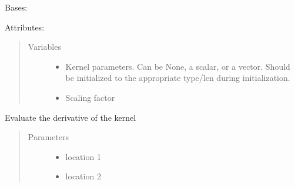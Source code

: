 \documentclass[letterpaper,12pt,english]{sphinxmanual}
\begin{document}
\begin{fulllineitems}
\label{\detokenize{PARyOpt.kernel:PARyOpt.kernel.kernel_function.KernelFunction}}
\sphinxAtStartPar
Bases: 

\sphinxAtStartPar
Attributes:
\begin{quote}\begin{description}
\item[{Variables}] \leavevmode\begin{itemize}
\item {} 
\sphinxAtStartPar
{} \textendash{} Kernel parameters. Can be None, a scalar, or a vector. Should be initialized to the appropriate     type/len during initialization.

\item {} 
\sphinxAtStartPar
{} \textendash{} Scaling factor

\end{itemize}

\end{description}\end{quote}

\begin{fulllineitems}
\label{\detokenize{PARyOpt.kernel:PARyOpt.kernel.kernel_function.KernelFunction.derivative}}
\sphinxAtStartPar
Evaluate the derivative of the kernel
\begin{quote}\begin{description}
\item[{Parameters}] \leavevmode\begin{itemize}
\item {} 
\sphinxAtStartPar
{} \textendash{} location 1

\item {} 
\sphinxAtStartPar
{} \textendash{} location 2


\end{itemize}
\end{description}
\end{quote}
\end{fulllineitems}
\end{fulllineitems}
\end{document}
